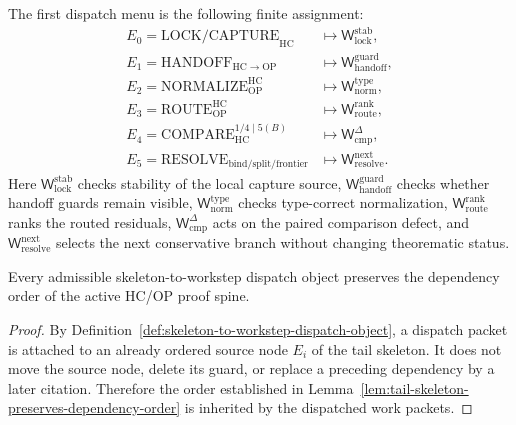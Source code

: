 \begin{definition}
\label{def:first-r15-dispatch-menu}
The first dispatch menu is the following finite assignment:
\[
\begin{aligned}
E_0=\mathrm{LOCK/CAPTURE}_{\mathrm{HC}}
 &\longmapsto
 \mathsf W_{\mathrm{lock}}^{\mathrm{stab}},\\
E_1=\mathrm{HANDOFF}_{\mathrm{HC}\to\mathrm{OP}}
 &\longmapsto
 \mathsf W_{\mathrm{handoff}}^{\mathrm{guard}},\\
E_2=\mathrm{NORMALIZE}_{\mathrm{OP}}^{\mathrm{HC}}
 &\longmapsto
 \mathsf W_{\mathrm{norm}}^{\mathrm{type}},\\
E_3=\mathrm{ROUTE}_{\mathrm{OP}}^{\mathrm{HC}}
 &\longmapsto
 \mathsf W_{\mathrm{route}}^{\mathrm{rank}},\\
E_4=\mathrm{COMPARE}_{\mathrm{HC}}^{1/4\mid 5(B)}
 &\longmapsto
 \mathsf W_{\mathrm{cmp}}^{\Delta},\\
E_5=\mathrm{RESOLVE}_{\mathrm{bind/split/frontier}}
 &\longmapsto
 \mathsf W_{\mathrm{resolve}}^{\mathrm{next}} .
\end{aligned}
\]
Here \(\mathsf W_{\mathrm{lock}}^{\mathrm{stab}}\) checks stability of the local capture source, \(\mathsf W_{\mathrm{handoff}}^{\mathrm{guard}}\) checks whether handoff guards remain visible, \(\mathsf W_{\mathrm{norm}}^{\mathrm{type}}\) checks type-correct normalization, \(\mathsf W_{\mathrm{route}}^{\mathrm{rank}}\) ranks the routed residuals, \(\mathsf W_{\mathrm{cmp}}^{\Delta}\) acts on the paired comparison defect, and \(\mathsf W_{\mathrm{resolve}}^{\mathrm{next}}\) selects the next conservative branch without changing theorematic status.
\end{definition}

\begin{lemma}
\label{lem:dispatch-preserves-tail-skeleton-order}
Every admissible skeleton-to-workstep dispatch object preserves the dependency order of the active HC/OP proof spine.
\end{lemma}

\begin{proof}
By Definition~\ref{def:skeleton-to-workstep-dispatch-object}, a dispatch packet is attached to an already ordered source node \(E_i\) of the tail skeleton. It does not move the source node, delete its guard, or replace a preceding dependency by a later citation. Therefore the order established in Lemma~\ref{lem:tail-skeleton-preserves-dependency-order} is inherited by the dispatched work packets.
\end{proof}

